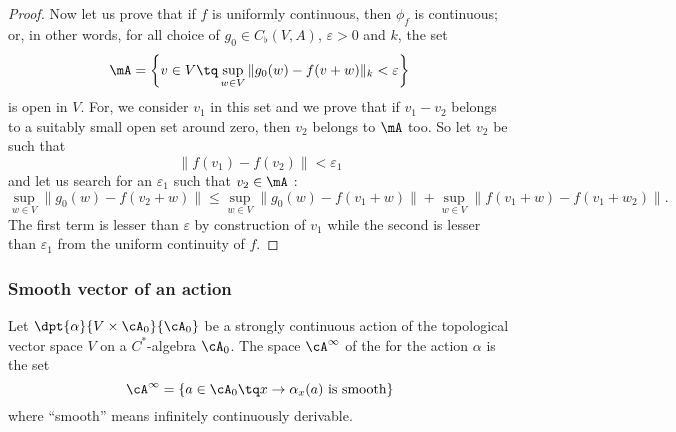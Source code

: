 \begin{proof}
Now let us prove that if $f$ is uniformly continuous, then $\phi_f$ is continuous; or, in other words, for all choice of $g_0\in C_{\flat}(V,A)$, $\varepsilon>0$ and $k$, the set
\begin{equation}
\mA=\left\{ v\in V\tq \sup_{w\in V}\| g_0(w)-f(v+w) \|_k<\varepsilon \right\}
\end{equation}
is open in $V$. For, we consider $v_1$ in this set and we prove that if $v_1-v_2$ belongs to a suitably small open set around zero, then $v_2$ belongs to $\mA$ too. So let $v_2$ be such that
\[ 
  \| f(v_1)-f(v_2) \|<\varepsilon_1
\]
and let us search for an $\varepsilon_1$ such that $v_2\in\mA$ :
\begin{equation}
   \sup_{w\in V}\| g_0(w)-f(v_2+w) \|\leq \sup_{w\in V}\| g_0(w)-f(v_1+w) \|+\sup_{w\in V}\| f(v_1+w)-f(v_1+w_2) \|.
\end{equation}
The first term is lesser than $\varepsilon$ by construction of $v_1$ while the second is lesser than $\varepsilon_1$ from the uniform continuity of $f$.

\end{proof}

\subsubsection{Smooth vector of an action}

Let $\dpt{\alpha}{V\times\cA_0}{\cA_0}$ be a strongly continuous action of the topological vector space $V$ on a $C^*$-algebra $\cA_0$. The space $\cA^{\infty}$ of the  for the action $\alpha$ is the set
\begin{equation}
  \cA^{\infty}=\{ a\in\cA_0\tq x\to\alpha_x(a)\textrm{ is smooth} \}
\end{equation}
where ``smooth'' means infinitely continuously derivable.

